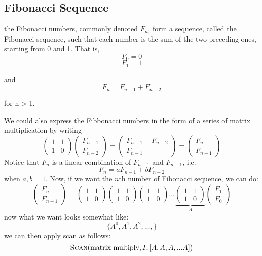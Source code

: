 \documentclass[12pt]{article}
\begin{document}
\subsection{Fibonacci Sequence }
\begin{definition}
	the Fibonacci numbers, commonly denoted $F_n$, form a sequence, called the Fibonacci sequence, such that each number is the sum of the two preceding ones, starting from 0 and 1. That is,
	$$F_0 = 0$$
	$$F_1= 1$$
	
	and 
	$$F_n = F_{n-1} + F_{n-2}$$
	
	for n > 1.
\end{definition}
We could also express the Fibbonacci numbers in the form of a series of matrix multiplication by writing
$$
\begin{pmatrix}
1 &1 \\
1 &0
\end{pmatrix}
\begin{pmatrix}
F_{n-1} \\
F_{n-2}
\end{pmatrix}
=
\begin{pmatrix}
F_{n-1} + F_{n-2}\\
F_{n-1}
\end{pmatrix}
=\begin{pmatrix}
F_n\\
F_{n-1}
\end{pmatrix}
$$
Notice that $F_n$ is a linear combination of $F_{n-1}$ and $F_{n-1}$, i.e.
$$F_n = aF_{n-1} + bF_{n-2}$$
when $a, b = 1$. Now, if we want the $n$th number of Fibonacci sequence, we can do:
$$
\begin{pmatrix}
F_{n} \\
F_{n-1}
\end{pmatrix} = 
\begin{pmatrix}
1 &1 \\
1 &0
\end{pmatrix}
\begin{pmatrix}
1 &1 \\
1 &0
\end{pmatrix}
\begin{pmatrix}
1 &1 \\
1 &0
\end{pmatrix}
...
\underbrace{
	\begin{pmatrix}
	1 &1 \\
	1 &0
	\end{pmatrix}
}_{A}
\begin{pmatrix}
F_{1} \\
F_{0}
\end{pmatrix}
$$
now what we want looks somewhat like:
$$\{A^0, A^1,A^2, ... , \}$$
we can then apply scan as follows:
$$\textsc{Scan}(\text{matrix multiply}, I, [A,A,A,...A]) $$
\end{document}
